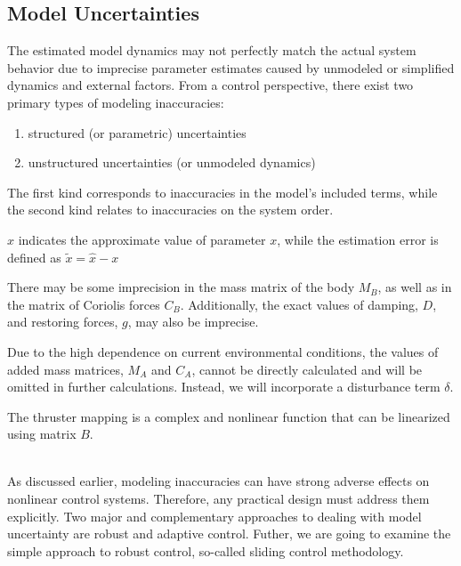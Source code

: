
\subsection{Model Uncertainties}

    The estimated model dynamics may not perfectly match the actual system behavior 
    due to imprecise parameter estimates caused by unmodeled or simplified dynamics 
    and external factors. From a control perspective, there exist two primary types 
    of modeling inaccuracies:
    \begin{enumerate}
        \item structured (or parametric) uncertainties
        \item unstructured uncertainties (or unmodeled dynamics)
    \end{enumerate}
    The first kind corresponds to inaccuracies in the model's included terms,
    while the second kind relates to inaccuracies on the
    system order.

    $\hat x$ indicates the approximate value of parameter $x$, while 
    the estimation error is defined as $\tilde x = \hat x - x$


    There may be some imprecision in the mass matrix of the body $M_B$, as well as 
    in the matrix of Coriolis forces $C_B$. Additionally, the exact values of damping, 
    $D$, and restoring forces, $g$, may also be imprecise.

    Due to the high dependence on current environmental conditions, the values of 
    added mass matrices, $M_A$ and $C_A$, cannot be directly calculated and will 
    be omitted in further calculations. Instead, we will incorporate a disturbance 
    term $\delta$. 

    The thruster mapping is a complex and nonlinear function that can be linearized 
    using matrix $B$.


    \\
    As discussed earlier, modeling inaccuracies can have strong adverse effects on
    nonlinear control systems. Therefore, any practical design must address them
    explicitly. Two major and complementary approaches to dealing with model uncertainty 
    are robust and adaptive control. Futher, we are going to examine the simple approach to 
    robust control, so-called sliding control methodology.

